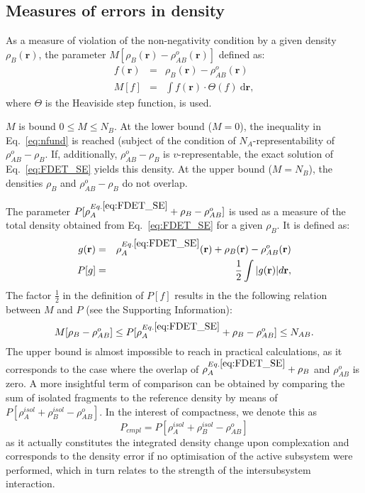 \documentclass[amsmath,amssymb,preprint,aip,jcp]{revtex4-1}
\newcommand{\nr}[1]{\color{red}#1\color{black}}
\begin{document}
\subsection{Measures of errors in density}
As a measure of violation of the non-negativity condition by a given density $\rho_{B}(\mathbf{r})$, the
 parameter $M[\rho_{B}(\mathbf{r})-\rho^{o}_{AB}(\mathbf{r})]$ defined as:
\begin{eqnarray}\label{eq:M}
f(\mathbf{r})&=&\rho_{B}(\mathbf{r})-\rho^{o}_{AB}(\mathbf{r}) \nonumber\\
 M[f] & = & \int f(\mathbf{r})\cdot \Theta(f) \ \mathrm{d}\mathbf{r}, \label{eq:def_M}
\end{eqnarray}
where $\Theta$ is the Heaviside step function, is used.

$M$ is bound $0 \le M\le N_{B}$. At the lower bound ($M=0$), the inequality in Eq.~\ref{eq:nfund} is reached (subject of the condition of $N_A$-representability of $\rho^{o}_{AB}-\rho_{B}$. If, additionally,  $\rho^{o}_{AB}-\rho_{B}$ is $v$-representable, the exact solution of Eq.~\ref{eq:FDET_SE} yield\nr{s } this density.  At the upper bound ($M=N_{B}$), the densities $\rho_{B}$ and $\rho^{o}_{AB}-\rho_{B}$ do not overlap.

The parameter $P[\rho_A^{Eq.\ref{eq:FDET_SE}}+\rho_B-\rho_{AB}^{o}]$ is used as a measure of the  total density obtained from Eq.~\ref{eq:FDET_SE}
for a given $\rho_{B}$. It is defined as: 
\begin{eqnarray}
g(\mathbf{r})&=&\rho^{Eq.\ref{eq:FDET_SE}}_A(\mathbf{r})+ \rho_B(\mathbf{r}) - \rho_{AB}^{o}(\mathbf{r}) \nonumber\\
 P[g] &=& \frac{1}{2} 
 \int \vert g(\mathbf{r})  \vert d\mathbf{r}, \label{eq:def_P}
\end{eqnarray}
The factor  $\frac{1}{2}$ in the definition of $P[f]$ results in
the the following relation between $M$ and $P$ (see the Supporting Information):
\begin{equation} \label{eq:P_bound}
 M[\rho_{B} - \rho^{o}_{AB}] \leq P[\rho^{Eq.\ref{eq:FDET_SE}}_A+\rho_B - \rho_{AB}^{o}]  \leq %
  N_{AB}.
\end{equation}
\nr{The upper bound is almost impossible to reach in practical calculations, as it corresponds to the case where the overlap of $\rho^{Eq.\ref{eq:FDET_SE}}_A+\rho_B$ and $\rho_{AB}^{o}$ is zero. A more insightful term of comparison can be obtained by comparing the sum of isolated fragments to the reference density by means of $P[\rho_A^{isol}+\rho_B^{isol} - \rho_{AB}^{o}]$. In the interest of compactness, we denote this as
\begin{equation}\label{eq:p_cmpl}
 P_{cmpl} = P[\rho_A^{isol}+\rho_B^{isol} - \rho_{AB}^{o}]
\end{equation}
as it actually constitutes the integrated density change upon complexation and corresponds to the density error if no optimisation of the active subsystem were performed, which in turn relates to the strength of the intersubsystem interaction.}
\end{document}
